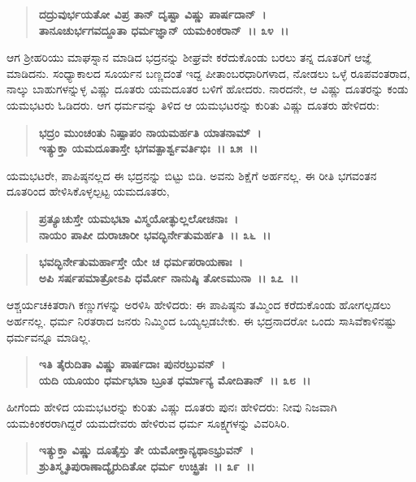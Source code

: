 \begin{verse}
\textbf{ದದ್ರುವುರ್ಭಯತೋ ವಿಪ್ರ ತಾನ್ ದೃಷ್ಟಾ ವಿಷ್ಣು ಪಾರ್ಷದಾನ್~।}\\\textbf{ತಾನೂಚುರ್ಭಗವದ್ದೂತಾ ಧರ್ಮಜ್ಞಾನ್ ಯಮಕಿಂಕರಾನ್~।। ೩೪~।।}
\end{verse}

ಆಗ ಶ‍್ರೀಹರಿಯು ಮಾಘಸ್ನಾನ ಮಾಡಿದ ಭದ್ರನನ್ನು ಶೀಘ್ರವೇ ಕರೆದುಕೊಂಡು ಬರಲು ತನ್ನ ದೂತರಿಗೆ ಆಜ್ಞೆ ಮಾಡಿದನು. ಸಂಧ್ಯಾಕಾಲದ ಸೂರ್ಯನ ಬಣ್ಣದಂತೆ ಇದ್ದ ಪೀತಾಂಬರಧಾರಿಗಳಾದ, ನೋಡಲು ಒಳ್ಳೆ ರೂಪವಂತರಾದ, ನಾಲ್ಕು ಬಾಹುಗಳನ್ನುಳ್ಳ ವಿಷ್ಣು ದೂತರು ಯಮದೂತರ ಬಳಿಗೆ ಹೋದರು. ನಾರದನೇ, ಆ ವಿಷ್ಣು ದೂತರನ್ನು ಕಂಡು ಯಮಭಟರು ಓಡಿದರು. ಆಗ ಧರ್ಮವನ್ನು ತಿಳಿದ ಆ ಯಮಭಟರನ್ನು ಕುರಿತು ವಿಷ್ಣು ದೂತರು ಹೇಳಿದರು:

\begin{verse}
\textbf{ಭದ್ರಂ ಮುಂಚಂತು ನಿಷ್ಪಾಪಂ ನಾಯಮರ್ಹತಿ ಯಾತನಾಮ್~।}\\\textbf{ಇತ್ಯುಕ್ತಾ ಯಮದೂತಾಸ್ತೇ ಭಗವತ್ಪಾರ್ಶ್ವವರ್ತಿಭಿಃ~।। ೩೫~।।}
\end{verse}

ಯಮಭಟರೇ, ಪಾಪಿಷ್ಠನಲ್ಲದ ಈ ಭದ್ರನನ್ನು ಬಿಟ್ಟು ಬಿಡಿ. ಅವನು ಶಿಕ್ಷೆಗೆ ಅರ್ಹನಲ್ಲ. ಈ ರೀತಿ ಭಗವಂತನ ದೂತರಿಂದ ಹೇಳಿಸಿಕೊಳ್ಳಲ್ಪಟ್ಟ ಯಮದೂತರು,

\begin{verse}
\textbf{ಪ್ರತ್ಯೂಚುಸ್ತೇ ಯಮಭಟಾ ವಿಸ್ಮಯೋತ್ಫುಲ್ಲಲೋಚನಾಃ~।}\\\textbf{ನಾಯಂ ಪಾಪೀ ದುರಾಚಾರೀ ಭವದ್ಭಿರ್ನೇತುಮರ್ಹತಿ~।। ೩೬~।। }
\end{verse}

\begin{verse}
\textbf{ಭವದ್ಭಿರ್ನೇತುಮರ್ಹಾಸ್ತೇ ಯೇ ಚ ಧರ್ಮಪರಾಯಣಾಃ~।}\\\textbf{ಅಪಿ ಸರ್ಷಪಮಾತ್ರೋಽಪಿ ಧರ್ಮೋ ನಾನುಷ್ಠಿ ತೋಽಮುನಾ~।। ೩೭~।।}
\end{verse}

ಆಶ್ಚರ್ಯಚಕಿತರಾಗಿ ಕಣ್ಣುಗಳನ್ನು ಅರಳಿಸಿ ಹೇಳಿದರು: ಈ ಪಾಪಿಷ್ಠನು ತಮ್ಮಿಂದ ಕರೆದುಕೊಂಡು ಹೋಗಲ್ಪಡಲು ಅರ್ಹನಲ್ಲ. ಧರ್ಮ ನಿರತರಾದ ಜನರು ನಿಮ್ಮಿಂದ ಒಯ್ಯಲ್ಪಡಬೇಕು. ಈ ಭದ್ರನಾದರೋ ಒಂದು ಸಾಸಿವೆಕಾಳಿನಷ್ಟು ಧರ್ಮವನ್ನೂ ಮಾಡಿಲ್ಲ.

\begin{verse}
\textbf{ಇತಿ ತೈರುದಿತಾ ವಿಷ್ಣು ಪಾರ್ಷದಾಃ ಪುನರಬ್ರುವನ್~।}\\\textbf{ಯದಿ ಯೂಯಂ ಧರ್ಮಭಟಾ ಬ್ರೂತ ಧರ್ಮಾನ್ಯ ಮೋದಿತಾನ್~।। ೩೮~।।}
\end{verse}

ಹೀಗೆಂದು ಹೇಳಿದ ಯಮಭಟರನ್ನು ಕುರಿತು ವಿಷ್ಣು ದೂತರು ಪುನಃ ಹೇಳಿದರು: ನೀವು ನಿಜವಾಗಿ ಯಮಕಿಂಕರರಾಗಿದ್ದರೆ ಯಮದೇವರು ಹೇಳಿರುವ ಧರ್ಮ ಸೂಕ್ಷ್ಮಗಳನ್ನು ವಿವರಿಸಿರಿ.

\begin{verse}
\textbf{ಇತ್ಯುಕ್ತಾ ವಿಷ್ಣು ದೂತೈಸ್ತು ತೇ ಯಮೋಕ್ತಾನ್ಯಥಾಽಭ್ರುವನ್~।}\\\textbf{ಶ್ರುತಿಸ್ಮೃತಿಪುರಾಣಾದ್ಯೈರುದಿತೋ ಧರ್ಮ ಉಚ್ಛ್ರಿತಃ~।। ೩೯~।।} 
\end{verse}

